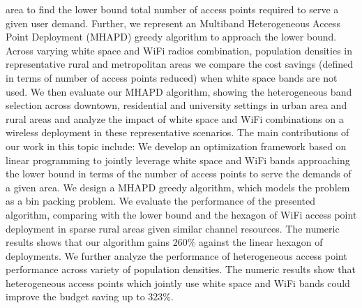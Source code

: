 area to find the lower bound total number of access points required to 
serve a given user demand. Further, we represent an Multiband Heterogeneous 
Access Point Deployment (MHAPD) greedy algorithm 
to approach the lower bound. Across varying white space and WiFi radios 
combination, population densities in representative rural and metropolitan 
areas we compare the cost savings (defined in terms of number of access 
points reduced) when white space bands are not used. We then evaluate our 
MHAPD algorithm, showing the heterogeneous band selection across downtown, 
residential and university settings in urban area and rural areas and analyze 
the impact of white space and WiFi combinations on a wireless deployment in 
these representative scenarios.
The main contributions of our work in this topic include: We develop an 
optimization framework based on linear programming to jointly leverage 
white space and WiFi bands approaching the lower bound in terms of the number 
of access points to serve the demands of a given area. We design a MHAPD 
greedy algorithm, which models the problem as a bin packing problem. We 
evaluate the performance of the presented algorithm, comparing with the 
lower bound and the hexagon of WiFi access point deployment in sparse rural 
areas given similar channel resources. The numeric results shows that our 
algorithm gains 260\% against the linear hexagon of deployments.  We 
further analyze the performance of heterogeneous access point performance 
across variety of population densities. The numeric results show that heterogeneous 
access points which jointly use white space and WiFi bands could improve 
the budget saving up to 323\%. 


